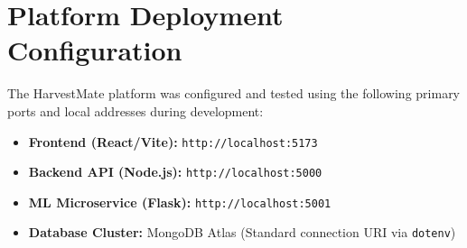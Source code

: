 \documentclass[12pt,a4paper]{report}
\begin{document}
\section{Platform Deployment Configuration}
The HarvestMate platform was configured and tested using the following primary ports and local addresses during development:
\begin{itemize}
    \item \textbf{Frontend (React/Vite):} \texttt{http://localhost:5173}
    \item \textbf{Backend API (Node.js):} \texttt{http://localhost:5000}
    \item \textbf{ML Microservice (Flask):} \texttt{http://localhost:5001}
    \item \textbf{Database Cluster:} MongoDB Atlas (Standard connection URI via \texttt{dotenv})
\end{itemize}

\end{document}
